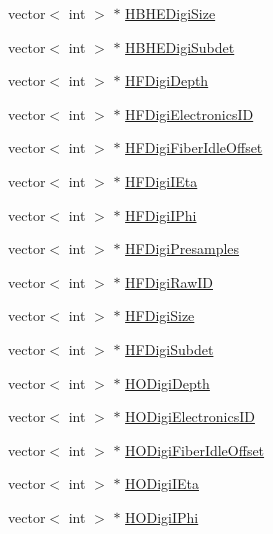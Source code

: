 \begin{DoxyCompactItemize}
\item 
vector$<$ int $>$ $\ast$ \hyperlink{class_hcal_tuple_tree_a285d80e2b161b7ee52a52e1439db3373}{H\+B\+H\+E\+Digi\+Size}
\item 
vector$<$ int $>$ $\ast$ \hyperlink{class_hcal_tuple_tree_aba0b417a85be88cc0f21e3d2cc19d80d}{H\+B\+H\+E\+Digi\+Subdet}
\item 
vector$<$ int $>$ $\ast$ \hyperlink{class_hcal_tuple_tree_a0e59299846d8138c04f69fe451511dfa}{H\+F\+Digi\+Depth}
\item 
vector$<$ int $>$ $\ast$ \hyperlink{class_hcal_tuple_tree_a9882d2d652d197b5ccdc03234ca08ca3}{H\+F\+Digi\+Electronics\+I\+D}
\item 
vector$<$ int $>$ $\ast$ \hyperlink{class_hcal_tuple_tree_a06e52ec27931ef2fc92bcc0efc8901ba}{H\+F\+Digi\+Fiber\+Idle\+Offset}
\item 
vector$<$ int $>$ $\ast$ \hyperlink{class_hcal_tuple_tree_add1b36acb835d09d747c682fb65ce7c9}{H\+F\+Digi\+I\+Eta}
\item 
vector$<$ int $>$ $\ast$ \hyperlink{class_hcal_tuple_tree_aaba8842e7e41699165e52a3345e36221}{H\+F\+Digi\+I\+Phi}
\item 
vector$<$ int $>$ $\ast$ \hyperlink{class_hcal_tuple_tree_ad7090a8222127b46bd6c6b4cafc79d43}{H\+F\+Digi\+Presamples}
\item 
vector$<$ int $>$ $\ast$ \hyperlink{class_hcal_tuple_tree_a55519617ad78d9e9ec81e88aaa2f7e60}{H\+F\+Digi\+Raw\+I\+D}
\item 
vector$<$ int $>$ $\ast$ \hyperlink{class_hcal_tuple_tree_a49bb2b44d538e77e9d13793881c53d97}{H\+F\+Digi\+Size}
\item 
vector$<$ int $>$ $\ast$ \hyperlink{class_hcal_tuple_tree_a7e6e32f123dcbd48805db8f63c17698e}{H\+F\+Digi\+Subdet}
\item 
vector$<$ int $>$ $\ast$ \hyperlink{class_hcal_tuple_tree_a0de64b4e4a03a43dd7bd54afe6b91121}{H\+O\+Digi\+Depth}
\item 
vector$<$ int $>$ $\ast$ \hyperlink{class_hcal_tuple_tree_af1e174814a68ab2f6d4d38208388b769}{H\+O\+Digi\+Electronics\+I\+D}
\item 
vector$<$ int $>$ $\ast$ \hyperlink{class_hcal_tuple_tree_aaff952a6b231321e8ff459a7be299b89}{H\+O\+Digi\+Fiber\+Idle\+Offset}
\item 
vector$<$ int $>$ $\ast$ \hyperlink{class_hcal_tuple_tree_a5f25a69ba6f14ae239054b745cc2f19c}{H\+O\+Digi\+I\+Eta}
\item 
vector$<$ int $>$ $\ast$ \hyperlink{class_hcal_tuple_tree_a4c609f165405dd9d65e93d84b7b2b08d}{H\+O\+Digi\+I\+Phi}

\end{DoxyCompactItemize}
